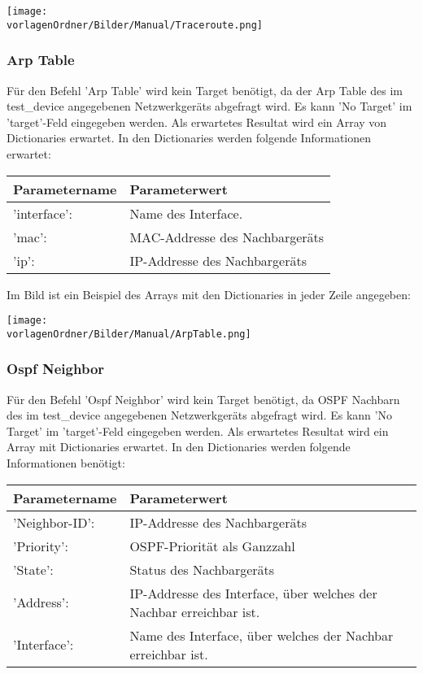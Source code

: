 \documentclass[
	ngerman,
	toc=listof, %
	toc=bibliography, %
	footnotes=multiple, %
	parskip=half, %
	numbers=noendperiod %
]{scrartcl}
\newcommand{\vorlagenOrdner}{../99_Vorlagen} %
\begin{document}
			\texttt{[image: \\vorlagenOrdner/Bilder/Manual/Traceroute.png]}

		\subsubsection{Arp Table}
			Für den Befehl 'Arp Table' wird kein Target benötigt, 
			da der Arp Table des im test\_device angegebenen Netzwerkgeräts abgefragt wird. 
			Es kann 'No Target' im 'target'-Feld eingegeben werden.
			Als erwartetes Resultat wird ein Array von Dictionaries erwartet. 
			In den Dictionaries werden folgende Informationen erwartet:

			\begin{tabularx}{\textwidth}{lX}
				\toprule
				Parametername & Parameterwert \\
				\midrule
				'interface': &  Name des Interface. \\
				'mac': &  MAC-Addresse des Nachbargeräts \\
				'ip': & IP-Addresse des Nachbargeräts \\
				\bottomrule
			\end{tabularx}

			Im Bild ist ein Beispiel des Arrays mit den Dictionaries in jeder Zeile angegeben:

			\texttt{[image: \\vorlagenOrdner/Bilder/Manual/ArpTable.png]}

		\subsubsection{Ospf Neighbor}
			Für den Befehl 'Ospf Neighbor' wird kein Target benötigt, 
			da OSPF Nachbarn des im test\_device angegebenen Netzwerkgeräts abgefragt wird. 
			Es kann 'No Target' im 'target'-Feld eingegeben werden.	
			Als erwartetes Resultat wird ein Array mit Dictionaries erwartet. 
			In den Dictionaries werden folgende Informationen benötigt:

			\begin{tabularx}{\textwidth}{lX}
				\toprule
				Parametername & Parameterwert\\
				\midrule 
				'Neighbor-ID': & IP-Addresse des Nachbargeräts \\
				'Priority': & OSPF-Priorität als Ganzzahl\\
				'State': & Status des Nachbargeräts \\
				'Address': & IP-Addresse des Interface, über welches der Nachbar erreichbar ist. \\
				'Interface': & Name des Interface, über welches der Nachbar erreichbar ist. \\
				\bottomrule
			\end{tabularx}
			
\end{document}
